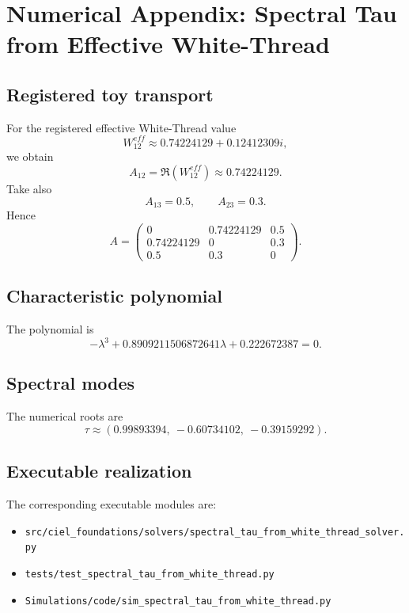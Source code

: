 \appendix
\section{Numerical Appendix: Spectral Tau from Effective White-Thread}
\label{app:spectral-tau-from-white-thread}

\subsection{Registered toy transport}
For the registered effective White-Thread value
\begin{equation}
W^{eff}_{12} \approx 0.74224129 + 0.12412309 i,
\end{equation}
we obtain
\begin{equation}
A_{12}=\Re(W^{eff}_{12})\approx 0.74224129.
\end{equation}
Take also
\begin{equation}
A_{13}=0.5,
\qquad
A_{23}=0.3.
\end{equation}
Hence
\begin{equation}
A=\begin{pmatrix}
0 & 0.74224129 & 0.5\\
0.74224129 & 0 & 0.3\\
0.5 & 0.3 & 0
\end{pmatrix}.
\end{equation}

\subsection{Characteristic polynomial}
The polynomial is
\begin{equation}
-\lambda^3 + 0.8909211506872641\lambda + 0.222672387 = 0.
\end{equation}

\subsection{Spectral modes}
The numerical roots are
\begin{equation}
\tau \approx (0.99893394,\ -0.60734102,\ -0.39159292).
\end{equation}

\subsection{Executable realization}
The corresponding executable modules are:
\begin{itemize}
  \item \texttt{src/ciel\_foundations/solvers/spectral\_tau\_from\_white\_thread\_solver.py}
  \item \texttt{tests/test\_spectral\_tau\_from\_white\_thread.py}
  \item \texttt{Simulations/code/sim\_spectral\_tau\_from\_white\_thread.py}
\end{itemize}
